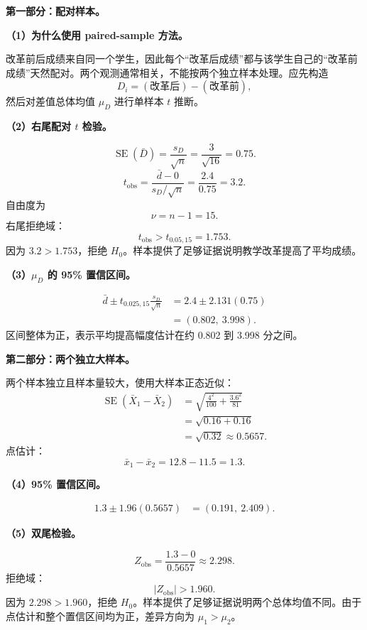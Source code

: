 \documentclass[11pt,a4paper]{article}
\newcommand{\SE}{\operatorname{SE}}
\begin{document}
\begin{solutionbox}
\textbf{第一部分：配对样本。}

\textbf{（1）为什么使用 paired-sample 方法。}

改革前后成绩来自同一个学生，因此每个“改革后成绩”都与该学生自己的“改革前成绩”天然配对。两个观测通常相关，不能按两个独立样本处理。应先构造
\[
  D_i=(\text{改革后})-(\text{改革前}),
\]
然后对差值总体均值 $\mu_D$ 进行单样本 $t$ 推断。

\textbf{（2）右尾配对 $t$ 检验。}

\[
  \SE(\bar D)
  =
  \frac{s_D}{\sqrt n}
  =
  \frac3{\sqrt{16}}
  =
  0.75.
\]
\[
  t_{\mathrm{obs}}
  =
  \frac{\bar d-0}{s_D/\sqrt n}
  =
  \frac{2.4}{0.75}
  =
  3.2.
\]
自由度为
\[
  \nu=n-1=15.
\]
右尾拒绝域：
\[
  t_{\mathrm{obs}}>t_{0.05,15}=1.753.
\]
因为 $3.2>1.753$，拒绝 $H_0$。样本提供了足够证据说明教学改革提高了平均成绩。

\textbf{（3）$\mu_D$ 的 95\% 置信区间。}

\[
\begin{aligned}
  \bar d
  \pm
  t_{0.025,15}\frac{s_D}{\sqrt n}
  &=
  2.4\pm2.131(0.75)\\
  &=
  \boxed{(0.802,\ 3.998)}.
\end{aligned}
\]
区间整体为正，表示平均提高幅度估计在约 0.802 到 3.998 分之间。

\textbf{第二部分：两个独立大样本。}

两个样本独立且样本量较大，使用大样本正态近似：
\[
\begin{aligned}
  \SE(\bar X_1-\bar X_2)
  &=
  \sqrt{\frac{4^2}{100}+\frac{3.6^2}{81}}\\
  &=
  \sqrt{0.16+0.16}\\
  &=
  \sqrt{0.32}
  \approx0.5657.
\end{aligned}
\]
点估计：
\[
  \bar x_1-\bar x_2=12.8-11.5=1.3.
\]

\textbf{（4）95\% 置信区间。}

\[
\begin{aligned}
  1.3\pm1.96(0.5657)
  &=
  \boxed{(0.191,\ 2.409)}.
\end{aligned}
\]

\textbf{（5）双尾检验。}

\[
  Z_{\mathrm{obs}}
  =
  \frac{1.3-0}{0.5657}
  \approx2.298.
\]
拒绝域：
\[
  |Z_{\mathrm{obs}}|>1.960.
\]
因为 $2.298>1.960$，拒绝 $H_0$。样本提供了足够证据说明两个总体均值不同。由于点估计和整个置信区间均为正，差异方向为 $\mu_1>\mu_2$。
\end{solutionbox}
\end{document}
